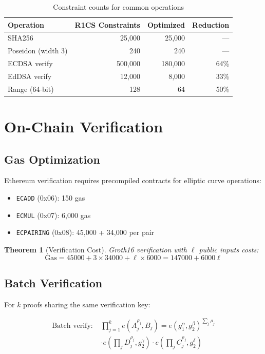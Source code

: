\documentclass[11pt,a4paper]{article}
\newtheorem{theorem}{Theorem}[section]
\newcommand{\pair}[2]{e(#1, #2)}
\begin{document}
\begin{table}[h]
\centering
\begin{tabular}{lrrr}
\toprule
\textbf{Operation} & \textbf{R1CS Constraints} & \textbf{Optimized} & \textbf{Reduction} \\
\midrule
SHA256 & 25,000 & 25,000 & --- \\
Poseidon (width 3) & 240 & 240 & --- \\
ECDSA verify & 500,000 & 180,000 & 64\% \\
EdDSA verify & 12,000 & 8,000 & 33\% \\
Range (64-bit) & 128 & 64 & 50\% \\
\bottomrule
\end{tabular}
\caption{Constraint counts for common operations}
\label{tab:constraints}
\end{table}

\section{On-Chain Verification}
\label{sec:verification}

\subsection{Gas Optimization}

Ethereum verification requires precompiled contracts for elliptic curve operations:

\begin{itemize}
    \item \texttt{ECADD} (0x06): 150 gas
    \item \texttt{ECMUL} (0x07): 6,000 gas
    \item \texttt{ECPAIRING} (0x08): 45,000 + 34,000 per pair
\end{itemize}

\begin{theorem}[Verification Cost]
Groth16 verification with $\ell$ public inputs costs:
\[
\text{Gas} = 45000 + 3 \times 34000 + \ell \times 6000 = 147000 + 6000\ell
\]
\end{theorem}

\subsection{Batch Verification}

For $k$ proofs sharing the same verification key:

\begin{align*}
\text{Batch verify: } & \prod_{j=1}^k \pair{A_j^{\rho_j}}{B_j} = \pair{g_1^\alpha}{g_2^\beta}^{\sum_j \rho_j} \\
& \cdot \pair{\prod_j D_j^{\rho_j}}{g_2^\gamma} \cdot \pair{\prod_j C_j^{\rho_j}}{g_2^\delta}
\end{align*}
\end{document}
